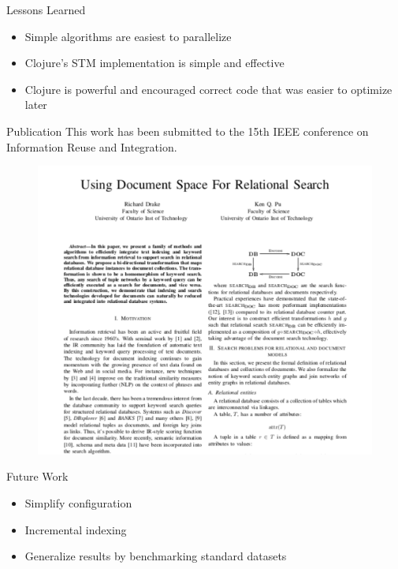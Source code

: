 \documentclass[compress]{beamer}
\begin{document}
		\begin{frame}{Lessons Learned}
			\begin{itemize}
				\item Simple algorithms are easiest to parallelize
				\item Clojure's STM implementation is simple and effective
				\item Clojure is powerful and encouraged correct code that was easier to optimize later
			\end{itemize}
		\end{frame}
		
		\begin{frame}{Publication}
			This work has been submitted to the 15th IEEE conference on Information Reuse and Integration.

			\begin{figure}
				\centering
				\includegraphics[scale=0.3]{figures/paper-thumbnail}
			\end{figure}
		\end{frame}
		
		\begin{frame}{Future Work}
			\begin{itemize}
				\item Simplify configuration
				\item Incremental indexing
				\item Generalize results by benchmarking standard datasets
			\end{itemize}
		\end{frame}
	
\end{document}
